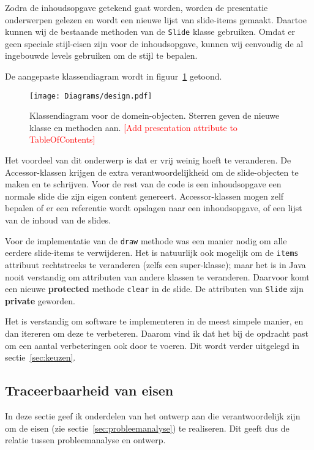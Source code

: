 \documentclass[a4paper]{article}
\newcommand{\todo}[1]{\textcolor{red}{[#1]}\\}
\newcommand{\code}[1]{\lstinline[columns=fixed]{#1}}
\begin{document}
    Zodra de inhoudsopgave getekend gaat worden, worden de presentatie onderwerpen gelezen en wordt een nieuwe lijst van slide-items gemaakt.
    Daartoe kunnen wij de bestaande methoden van de \code{Slide} klasse gebruiken.
    Omdat er geen speciale stijl-eisen zijn voor de inhoudsopgave, kunnen wij eenvoudig de al ingebouwde levels gebruiken om de stijl te bepalen.

    De aangepaste klassendiagram wordt in figuur~\ref{fig:design} getoond.
    \begin{figure}[!htb]
     \caption{
        Klassendiagram voor de domein-objecten.\label{fig:design}
        Sterren geven de nieuwe klasse en methoden aan.
        \todo{Add presentation attribute to TableOfContents}
     }
     \centering \texttt{[image: Diagrams/design.pdf]}
    \end{figure}

    Het voordeel van dit onderwerp is dat er vrij weinig hoeft te veranderen.
    De Accessor-klassen krijgen de extra verantwoordelijkheid om de slide-objecten te maken en te schrijven.
    Voor de rest van de code is een inhoudsopgave een normale slide die zijn eigen content genereert.
    Accessor-klassen mogen zelf bepalen of er een referentie wordt opslagen naar een inhoudsopgave, of een lijst van de inhoud van de slides.

    Voor de implementatie van de \code{draw} methode was een manier nodig om alle eerdere slide-items te verwijderen.
    Het is natuurlijk ook mogelijk om de \code{items} attribuut rechtstreeks te veranderen (zelfs een super-klasse);
    maar het is in Java nooit verstandig om attributen van andere klassen te veranderen.
    Daarvoor komt een nieuwe \textbf{protected} methode \code{clear} in de slide.
    De attributen van \code{Slide} zijn \textbf{private} geworden.

    Het is verstandig om software te implementeren in de meest simpele manier, en dan itereren om deze te verbeteren.
    Daarom vind ik dat het bij de opdracht past om een aantal verbeteringen ook door te voeren.
    Dit wordt verder uitgelegd in sectie~\ref{sec:keuzen}.

    \subsection{Traceerbaarheid van eisen}
        In deze sectie geef ik onderdelen van het ontwerp aan die verantwoordelijk zijn om de eisen (zie sectie~\ref{sec:probleemanalyse}) te realiseren.
        Dit geeft dus de relatie tussen probleemanalyse en ontwerp.
\end{document}
